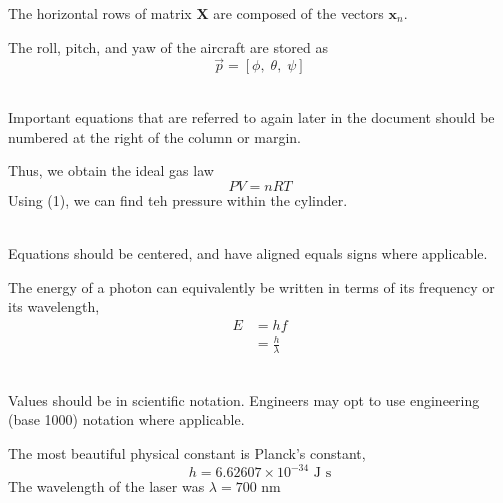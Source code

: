\documentclass{bannerReport}
\begin{document}
				\vspace{-.1cm}
				\begin{dent}
					The horizontal rows of matrix $\boldsymbol{X}$ are composed of the vectors $\boldsymbol{x}_n$.

					\noindent\makebox[\linewidth]{\rule{8cm}{0.4pt}}

					The roll, pitch, and yaw of the aircraft are stored as
					\begin{equation*}
						\vec{p} = [\phi, \; \theta, \; \psi]
					\end{equation*}
				\end{dent}
				~\\
				Important equations that are referred to again later in the document should be numbered at the right of the column or margin.
				\vspace{-.4cm}
				\begin{dent}
					Thus, we obtain the ideal gas law				
					\begin{equation}
						PV = nRT
					\end{equation}
					Using (1), we can find teh pressure within the cylinder.
				\end{dent}
				~\\
				Equations should be centered, and have aligned equals signs where applicable.
				\vspace{-.1cm}
				\begin{dent}
					The energy of a photon can equivalently be written in terms of its frequency or its wavelength,
					\begin{align*}
						E &= hf \\
						&= \frac{h}\lambda
					\end{align*}
				\end{dent}
				~\\
				Values should be in scientific notation. Engineers may opt to use engineering (base 1000) notation where applicable.
				\vspace{-.1cm}
				\begin{dent}
					The most beautiful physical constant is Planck’s constant,
					$$
						h = 6.62607 \times 10^{-34} \text{ J s}
					$$
					The wavelength of the laser was $\lambda = 700 \text{ nm}$
				\end{dent}
\end{document}
